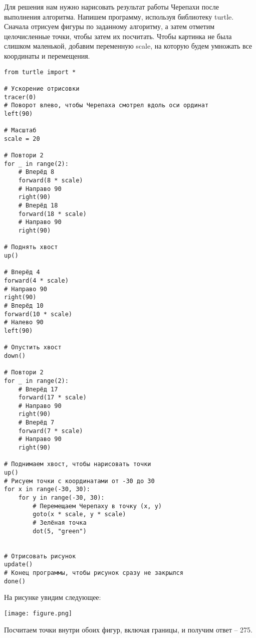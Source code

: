 \documentclass[14pt,a4paper]{article}
\begin{document}
Для решения нам нужно нарисовать результат работы Черепахи после выполнения алгоритма. Напишем программу, используя библиотеку turtle. Сначала отрисуем фигуры по заданному алгоритму, а затем отметим целочисленные точки, чтобы затем их посчитать. Чтобы картинка не была слишком маленькой, добавим переменную scale, на которую будем умножать все координаты и перемещения.

\begin{verbatim}
from turtle import *

# Ускорение отрисовки
tracer(0)
# Поворот влево, чтобы Черепаха смотрел вдоль оси ординат
left(90)

# Масштаб
scale = 20

# Повтори 2
for _ in range(2):
    # Вперёд 8
    forward(8 * scale)
    # Направо 90
    right(90)
    # Вперёд 18
    forward(18 * scale)
    # Направо 90
    right(90)

# Поднять хвост
up()

# Вперёд 4
forward(4 * scale)
# Направо 90
right(90)
# Вперёд 10
forward(10 * scale)
# Налево 90
left(90)

# Опустить хвост
down()

# Повтори 2
for _ in range(2):
    # Вперёд 17
    forward(17 * scale)
    # Направо 90
    right(90)
    # Вперёд 7
    forward(7 * scale)
    # Направо 90
    right(90)

# Поднимаем хвост, чтобы нарисовать точки
up()
# Рисуем точки с координатами от -30 до 30
for x in range(-30, 30):
    for y in range(-30, 30):
        # Перемещаем Черепаху в точку (x, y)
        goto(x * scale, y * scale)
        # Зелёная точка
        dot(5, "green")


# Отрисовать рисунок
update()
# Конец программы, чтобы рисунок сразу не закрылся
done()
\end{verbatim}

На рисунке увидим следующее:
\begin{center}
    \texttt{[image: figure.png]}
\end{center}

Посчитаем точки внутри обоих фигур, включая границы, и получим ответ -- 275.
\end{document}
